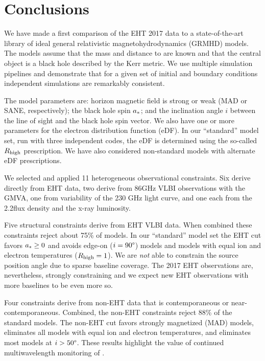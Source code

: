 \section{Conclusions}
\label{sec:conclusions}

We have made a first comparison of the EHT 2017 \sgra data to a state-of-the-art library of ideal general relativistic magnetohydrodynamics (GRMHD) models.  The models assume that the mass and distance to \sgra are known and that the central object is a black hole described by the Kerr metric. We use multiple simulation pipelines and demonstrate that for a given set of initial and boundary conditions independent simulations are remarkably consistent.

The model parameters are: horizon magnetic field is strong or weak (MAD or SANE, respectively); the black hole spin $a_*$; and the inclination angle $i$ between the line of sight and the black hole spin vector.  We also have one or more parameters for the electron distribution function (eDF).  In our ``standard'' model set, run with three independent codes, the eDF is determined using the so-called $R_\mathrm{high}$ prescription.  We have also considered non-standard models with alternate eDF prescriptions.

We selected and applied 11 heterogeneous observational constraints.  Six derive directly from EHT data, two derive from 86GHz VLBI observations with the GMVA, one from variability of the 230 GHz light curve, and one each from the 2.2\um flux density and the x-ray luminosity.

Five structural constraints derive from EHT VLBI data.  When combined these constraints reject about 75\% of models.  In our ``standard'' model set the EHT cut favors $a_* \ge 0$ and avoids edge-on ($i = 90\degree$) models and models with equal ion and electron temperatures ($R_\mathrm{high} = 1$).  We are {\em not} able to constrain the source position angle due to sparse baseline coverage.  The 2017 EHT observations are, nevertheless, strongly constraining and we expect new EHT observations with more baselines to be even more so.

Four constraints derive from non-EHT data that is contemporaneous or near-contemporaneous.  Combined, the non-EHT constraints reject 88\% of the standard models.  The non-EHT cut favors strongly magnetized (MAD) models, eliminates all models with equal ion and electron temperatures, and eliminates most models at $i > 50\degree$.  These results highlight the value of continued multiwavelength monitoring of \sgra.

